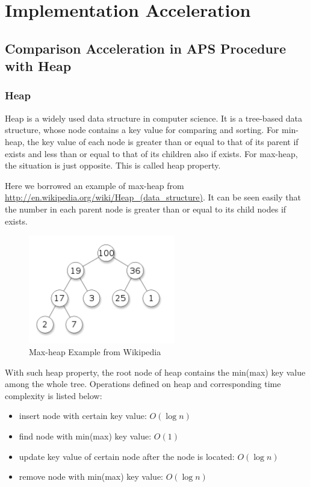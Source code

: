 \chapter{Implementation Acceleration}

\section{Comparison Acceleration in APS Procedure with Heap}

\subsection{Heap}

Heap is a widely used data structure in computer science. It is a tree-based data structure, whose node contains a key value for comparing and sorting. For min-heap, the key value of each node is greater than or equal to that of its parent if exists and less than or equal to that of its children also if exists. For max-heap, the situation is just opposite. This is called heap property.

Here we borrowed an example of max-heap from \url{http://en.wikipedia.org/wiki/Heap_(data_structure)}. It can be seen easily that the number in each parent node is greater than or equal to its child nodes if exists.

\begin{figure}[ht]
\centering
\includegraphics[width=64mm]{heap.png}
\caption{Max-heap Example from Wikipedia}
\end{figure}

With such heap property, the root node of heap contains the min(max) key value among the whole tree. Operations defined on heap and corresponding time complexity is listed below:

\begin{itemize}
\item insert node with certain key value: $O(\log n)$
\item find node with min(max) key value: $O(1)$
\item update key value of certain node after the node is located: $O(\log n)$
\item remove node with min(max) key value: $O(\log n)$
\end{itemize}

